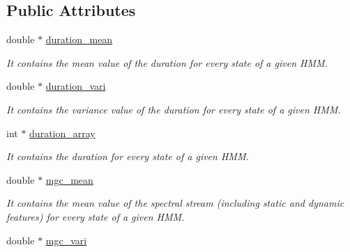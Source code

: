 \subsection*{Public Attributes}
\begin{DoxyCompactItemize}
\item 
\hypertarget{class_m_a_g_e_1_1_model_memory_a3fa3ae357555f0af234d82e9323b8846}{double $\ast$ \hyperlink{class_m_a_g_e_1_1_model_memory_a3fa3ae357555f0af234d82e9323b8846}{duration\-\_\-mean}}\label{class_m_a_g_e_1_1_model_memory_a3fa3ae357555f0af234d82e9323b8846}

\begin{DoxyCompactList}\small\item\em It contains the mean value of the duration for every state of a given H\-M\-M. \end{DoxyCompactList}\item 
\hypertarget{class_m_a_g_e_1_1_model_memory_a05baed554a9634c42ea1e15650b65532}{double $\ast$ \hyperlink{class_m_a_g_e_1_1_model_memory_a05baed554a9634c42ea1e15650b65532}{duration\-\_\-vari}}\label{class_m_a_g_e_1_1_model_memory_a05baed554a9634c42ea1e15650b65532}

\begin{DoxyCompactList}\small\item\em It contains the variance value of the duration for every state of a given H\-M\-M. \end{DoxyCompactList}\item 
\hypertarget{class_m_a_g_e_1_1_model_memory_ade9a7acd349027d31a76d6b1d2afa0ba}{int $\ast$ \hyperlink{class_m_a_g_e_1_1_model_memory_ade9a7acd349027d31a76d6b1d2afa0ba}{duration\-\_\-array}}\label{class_m_a_g_e_1_1_model_memory_ade9a7acd349027d31a76d6b1d2afa0ba}

\begin{DoxyCompactList}\small\item\em It contains the duration for every state of a given H\-M\-M. \end{DoxyCompactList}\item 
\hypertarget{class_m_a_g_e_1_1_model_memory_a55d427b2adcec893e5b1656d8681ae26}{double $\ast$ \hyperlink{class_m_a_g_e_1_1_model_memory_a55d427b2adcec893e5b1656d8681ae26}{mgc\-\_\-mean}}\label{class_m_a_g_e_1_1_model_memory_a55d427b2adcec893e5b1656d8681ae26}

\begin{DoxyCompactList}\small\item\em It contains the mean value of the spectral stream (including static and dynamic features) for every state of a given H\-M\-M. \end{DoxyCompactList}\item 
\hypertarget{class_m_a_g_e_1_1_model_memory_adf4a17940d051617a93a39b1bbe1d72f}{double $\ast$ \hyperlink{class_m_a_g_e_1_1_model_memory_adf4a17940d051617a93a39b1bbe1d72f}{mgc\-\_\-vari}}\label{class_m_a_g_e_1_1_model_memory_adf4a17940d051617a93a39b1bbe1d72f}


\end{DoxyCompactItemize}

